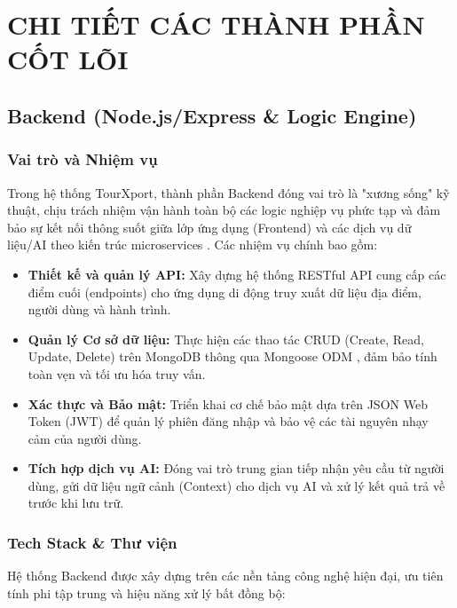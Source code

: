 \chapter{CHI TIẾT CÁC THÀNH PHẦN CỐT LÕI}

\section{Backend (Node.js/Express \& Logic Engine)}

\subsection{Vai trò và Nhiệm vụ}
\quad Trong hệ thống TourXport, thành phần Backend đóng vai trò là "xương sống" kỹ thuật, chịu trách nhiệm vận hành toàn bộ các logic nghiệp vụ phức tạp và đảm bảo sự kết nối thông suốt giữa lớp ứng dụng (Frontend) và các dịch vụ dữ liệu/AI theo kiến trúc microservices \cite{microservices}. Các nhiệm vụ chính bao gồm:

\begin{itemize}
    \item \textbf{Thiết kế và quản lý API:} Xây dựng hệ thống RESTful API \cite{restapi} cung cấp các điểm cuối (endpoints) cho ứng dụng di động truy xuất dữ liệu địa điểm, người dùng và hành trình.
    \item \textbf{Quản lý Cơ sở dữ liệu:} Thực hiện các thao tác CRUD (Create, Read, Update, Delete) trên MongoDB thông qua Mongoose ODM \cite{mongoose}, đảm bảo tính toàn vẹn và tối ưu hóa truy vấn.
    \item \textbf{Xác thực và Bảo mật:} Triển khai cơ chế bảo mật dựa trên JSON Web Token (JWT) để quản lý phiên đăng nhập và bảo vệ các tài nguyên nhạy cảm của người dùng.
    \item \textbf{Tích hợp dịch vụ AI:} Đóng vai trò trung gian tiếp nhận yêu cầu từ người dùng, gửi dữ liệu ngữ cảnh (Context) cho dịch vụ AI và xử lý kết quả trả về trước khi lưu trữ.
\end{itemize}

\subsection{Tech Stack \& Thư viện}
Hệ thống Backend được xây dựng trên các nền tảng công nghệ hiện đại, ưu tiên tính phi tập trung và hiệu năng xử lý bất đồng bộ:

